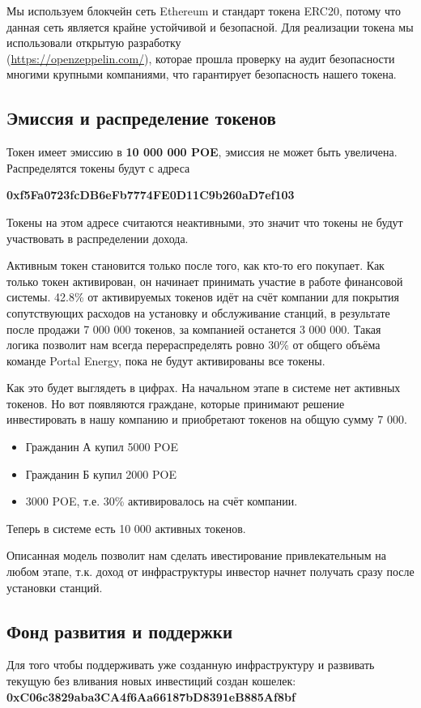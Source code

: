 \documentclass[a4paper,12pt]{report}
\begin{document}
Мы используем блокчейн сеть Ethereum и стандарт токена ERC20, потому что данная сеть является крайне устойчивой и безопасной.
Для реализации токена мы использовали открытую разработку \\ (\href{https://openzeppelin.com/}{https://openzeppelin.com/}), которае прошла проверку на аудит безопасности многими крупными компаниями, что гарантирует безопасность нашего токена.


\subsection{Эмиссия и распределение токенов}

Токен имеет эмиссию в \textbf{10 000 000 POE}, эмиссия не может быть увеличена. Распределятся токены будут с адреса 

\textbf{0xf5Fa0723fcDB6eFb7774FE0D11C9b260aD7ef103}

Токены на этом адресе считаются неактивными, это значит что токены не будут участвовать в распределении дохода.  

Активным токен становится только после того, как кто-то его покупает. Как только токен активирован, он начинает принимать участие в работе финансовой системы. 
42.8\% от активируемых токенов идёт на счёт компании для покрытия сопутствующих расходов на установку и обслуживание станций, в результате после продажи 7 000 000 токенов, за компанией останется 3 000 000. Такая логика позволит нам всегда перераспределять ровно 30\% от общего объёма команде Portal Energy, пока не будут активированы все токены.

Как это будет выглядеть в цифрах.
На начальном этапе в системе нет активных токенов. Но вот появляются граждане, которые принимают решение инвестировать в нашу компанию и приобретают токенов на общую сумму 7 000. 
\begin{itemize}
	\item Гражданин А купил 5000 POE
	\item Гражданин Б купил 2000 POE
	\item 3000 POE, т.е. 30\% активировалось на счёт компании.
\end{itemize}

Теперь в системе есть 10 000 активных токенов.

Описанная модель позволит нам сделать ивестирование привлекательным на любом этапе, т.к. доход от инфраструктуры инвестор начнет получать сразу после установки станций. 

\subsection{Фонд развития и поддержки}
Для того чтобы поддерживать уже созданную инфраструктуру и развивать текущую без вливания новых инвестиций создан кошелек: 
\textbf{0xC06c3829aba3CA4f6Aa66187bD8391eB885Af8bf}
\end{document}
